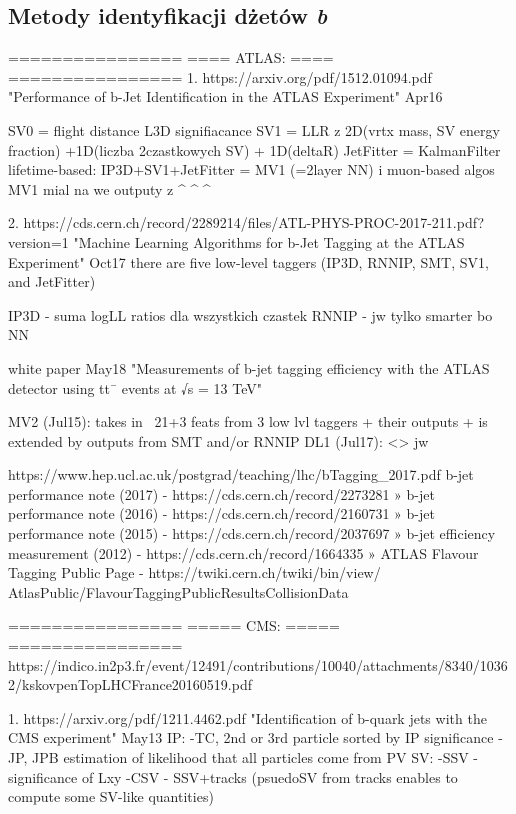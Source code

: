 \subsection{Metody identyfikacji dżetów \textit{b}}
================
==== ATLAS: ====
================
1. 
https://arxiv.org/pdf/1512.01094.pdf 
"Performance of b-Jet Identification in the ATLAS Experiment" Apr16

SV0 = flight distance L3D signifiacance
SV1 = LLR z 2D(vrtx mass, SV energy fraction) +1D(liczba 2czastkowych SV) + 1D(deltaR)
JetFitter = KalmanFilter
lifetime-based: IP3D+SV1+JetFitter = MV1 (=2layer NN)  i  muon-based algos
MV1 mial na we outputy z ^ ^ ^


2.
https://cds.cern.ch/record/2289214/files/ATL-PHYS-PROC-2017-211.pdf?version=1
"Machine Learning Algorithms for b-Jet Tagging at the ATLAS Experiment" Oct17
there are five low-level taggers (IP3D, RNNIP, SMT, SV1, and JetFitter) 

IP3D - suma logLL ratios dla wszystkich czastek
RNNIP - jw tylko smarter bo NN

white paper May18
"Measurements of b-jet tagging efficiency with the ATLAS detector using tt¯ events at √s = 13 TeV"

MV2 (Jul15): takes in ~21+3 feats from 3 low lvl taggers + their outputs + is extended by outputs from SMT and/or RNNIP
DL1 (Jul17): <> jw



https://www.hep.ucl.ac.uk/postgrad/teaching/lhc/bTagging_2017.pdf
b-jet performance note (2017) - https://cds.cern.ch/record/2273281
» b-jet performance note (2016) - https://cds.cern.ch/record/2160731
» b-jet performance note (2015) - https://cds.cern.ch/record/2037697
» b-jet efficiency measurement (2012) - https://cds.cern.ch/record/1664335
» ATLAS Flavour Tagging Public Page - https://twiki.cern.ch/twiki/bin/view/
AtlasPublic/FlavourTaggingPublicResultsCollisionData







================
===== CMS: =====
================
https://indico.in2p3.fr/event/12491/contributions/10040/attachments/8340/10362/kskovpenTopLHCFrance20160519.pdf

1.
https://arxiv.org/pdf/1211.4462.pdf
"Identification of b-quark jets with the CMS experiment" May13
IP:
-TC, 2nd or 3rd particle sorted by IP significance
-JP, JPB estimation of likelihood that all particles come from PV
SV:
-SSV - significance of Lxy
-CSV - SSV+tracks (psuedoSV from tracks enables to compute some SV-like quantities)

